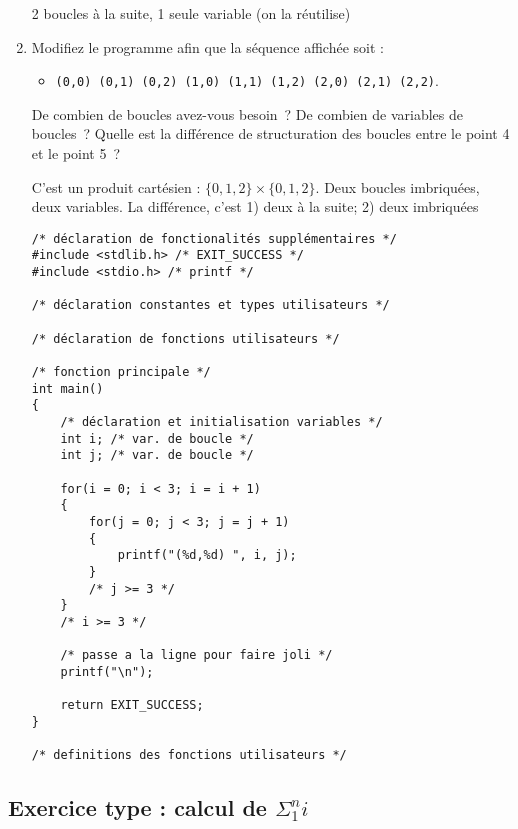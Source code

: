 \begin{enumerate}
  \begin{correction}
    2 boucles à la suite, 1 seule variable (on la réutilise)
  \end{correction}

\item Modifiez le programme afin que la séquence affichée soit :
  \begin{itemize}
  \item \verb|(0,0) (0,1) (0,2) (1,0) (1,1) (1,2) (2,0) (2,1) (2,2)|.
  \end{itemize}
  
  De combien de boucles avez-vous besoin~? De combien de variables de
  boucles~? Quelle est la différence de structuration
  des boucles entre le point 4 et le point 5~?

  \begin{correction}
    C'est un produit cartésien : $\{0,1,2\} \times \{0,1,2\}$. Deux boucles
    imbriquées, deux variables. La différence, c'est 1) deux à la suite; 2)
    deux imbriquées 

\begin{verbatim}
/* déclaration de fonctionalités supplémentaires */
#include <stdlib.h> /* EXIT_SUCCESS */
#include <stdio.h> /* printf */

/* déclaration constantes et types utilisateurs */

/* déclaration de fonctions utilisateurs */

/* fonction principale */
int main()
{
    /* déclaration et initialisation variables */
    int i; /* var. de boucle */
    int j; /* var. de boucle */

    for(i = 0; i < 3; i = i + 1)
    {
        for(j = 0; j < 3; j = j + 1)
        {
            printf("(%d,%d) ", i, j);
        }
        /* j >= 3 */
    }
    /* i >= 3 */

    /* passe a la ligne pour faire joli */
    printf("\n");

    return EXIT_SUCCESS;
}

/* definitions des fonctions utilisateurs */
\end{verbatim}
\end{correction}

\end{enumerate}

\subsection{Exercice type : calcul de $\Sigma_1^n i$}

